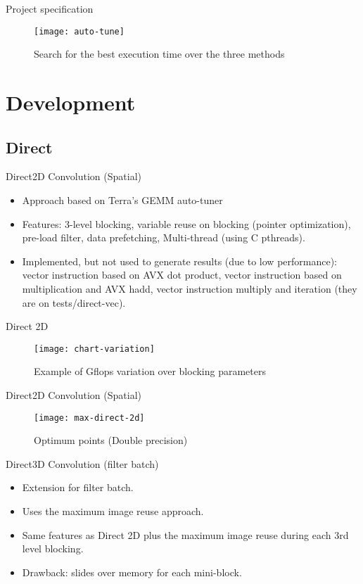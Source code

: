\documentclass{beamer}
\begin{document}
\begin{frame}{Project specification}
 \begin{figure}[ht] \label{fig1} 
\texttt{[image: auto-tune]}
 \caption{Search for the best execution time over the three methods} 
\end{figure}
\end{frame}

\section{Development}

\subsection{Direct}

\begin{frame}{Direct}{2D Convolution (Spatial)}

  \begin{itemize}
  \item {
   Approach based on Terra's GEMM auto-tuner
  }
   \item {   
    Features: 3-level blocking, variable reuse on blocking (pointer optimization), pre-load filter, data prefetching, Multi-thread (using C pthreads).
  }
   \item {   
    Implemented, but not used to generate results (due to low performance): vector instruction based on AVX dot product, vector instruction based on multiplication and AVX hadd, vector instruction multiply and iteration (they are on tests/direct-vec).
  }
  \end{itemize}
\end{frame}

\begin{frame}{Direct 2D}
\begin{figure}[ht] \label{fig1} 
\texttt{[image: chart-variation]}
 \caption{Example of Gflops variation over blocking parameters} 
\end{figure}
\end{frame}

\begin{frame}{Direct}{2D Convolution (Spatial)}
    \begin{figure}[ht] \label{fig1} 
        \texttt{[image: max-direct-2d]}
        \caption{Optimum points (Double precision)} 
    \end{figure}
\end{frame}
\begin{frame}{Direct}{3D Convolution (filter batch)}
  \begin{itemize}
  \item {
   Extension for filter batch.
  }
  \item {
   Uses the maximum image reuse approach.
  }
   \item {   
    Same features as Direct 2D plus the maximum image reuse during each 3rd level blocking.
  }
  \item {   
    Drawback: slides over memory for each mini-block.
  }
  \end{itemize}
\end{frame}
\end{document}

